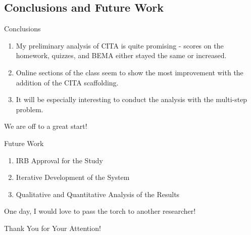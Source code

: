 \documentclass{beamer}
\begin{document}
\subsection*{Conclusions and Future Work}

\begin{frame}{Conclusions}
  \begin{enumerate}
    \item My preliminary analysis of CITA is quite promising - scores on the homework, quizzes, and BEMA either stayed the same or increased.
    \item Online sections of the class seem to show the most improvement with the addition of the CITA scaffolding.
    \item It will be especially interesting to conduct the analysis with the multi-step problem.
  \end{enumerate}
  \begin{center}
  We are off to a great start!
  \end{center}
\end{frame}

\begin{frame}{Future Work}
  \begin{enumerate}
    \item IRB Approval for the Study
    \item Iterative Development of the System
    \item Qualitative and Quantitative Analysis of the Results
  \end{enumerate}
  \begin{center}
  One day, I would love to pass the torch to another researcher!
  \end{center}
\end{frame}

\begin{frame}{}
  \begin{center}
  Thank You for Your Attention!
  \end{center}
\end{frame}
\end{document}
